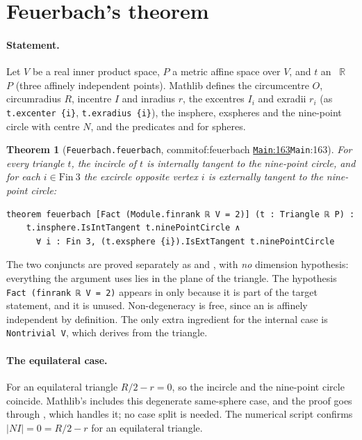 \documentclass[11pt]{article}
\newtheorem{theorem}{Theorem}
\theoremstyle{definition}
\theoremstyle{remark}
\newcommand{\lean}[1]{\texttt{#1}}
\newcommand{\RR}{\mathbb{R}}
\newcommand{\commitof}[1]{\csname commitof:#1\endcsname}
\newcommand{\repo}[1]{https://github.com/jpbald93/#1}
\newcommand{\src}[4]{\ifcsname commitof:#1\endcsname
  \href{\repo{#1}/blob/\commitof{#1}/#2/#3.lean\#L#4}{\texttt{#3}:#4}\else\texttt{#3}:#4\fi}
\begin{document}
\section{Feuerbach's theorem}\label{sec:feuerbach}

\paragraph{Statement.} Let $V$ be a real inner product space, $P$ a metric affine space over $V$,
and $t$ an ~$\RR$~$P$ (three affinely independent points). Mathlib defines
the circumcentre $O$, circumradius $R$, incentre $I$ and inradius $r$, the excentres $I_i$ and
exradii $r_i$ (as \lean{t.excenter \{i\}}, \lean{t.exradius \{i\}}), the insphere, exspheres and
the nine-point circle with centre $N$, and the predicates  and
 for spheres.

\begin{theorem}[\texttt{Feuerbach.feuerbach}, \src{feuerbach}{Feuerbach}{Main}{163}]\label{thm:feuerbach}
For every triangle $t$, the incircle of $t$ is internally tangent to the nine-point circle, and for
each $i\in\mathrm{Fin}\ 3$ the excircle opposite vertex $i$ is externally tangent to the nine-point
circle:
\begin{lstlisting}
theorem feuerbach [Fact (Module.finrank ℝ V = 2)] (t : Triangle ℝ P) :
    t.insphere.IsIntTangent t.ninePointCircle ∧
      ∀ i : Fin 3, (t.exsphere {i}).IsExtTangent t.ninePointCircle
\end{lstlisting}
\end{theorem}

The two conjuncts are proved separately as 
and , with \emph{no} dimension hypothesis:
everything the argument uses lies in the plane of the triangle. The hypothesis
\lean{Fact (finrank ℝ V = 2)} appears in  only because it is part of the
target statement, and it is unused. Non-degeneracy is free, since an  is
affinely independent by definition. The only extra ingredient for the internal case is
\lean{Nontrivial V}, which  derives from the triangle.

\paragraph{The equilateral case.} For an equilateral triangle $R/2-r=0$, so the incircle and the
nine-point circle coincide. Mathlib's  includes this degenerate same-sphere
case, and the proof goes through ,
which handles it; no case split is needed. The numerical script confirms $|NI|=0=R/2-r$ for an
equilateral triangle.
\end{document}
